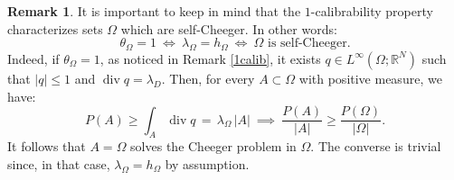\documentclass[reqno,11pt]{amsart}
\theoremstyle{definition}
\newtheorem{remark}[theorem]{Remark}
\numberwithin{equation}{section}
\DeclareMathOperator{\Div}{div}
\renewcommand{\div}{\Div}
\def\R{\mathbb{R}}
\newcommand{\1}{{{\bf 1}\kern-0,28em\rm l}}
\def\O{\Omega}
\def\l{\lambda}
\begin{document}
\begin{remark}\label{calib-Cheeger}  It is important to keep in mind that the $1$-calibrability property characterizes sets $\O$ which are self-Cheeger. In other words:
\begin{equation}\label{1calib=Cheeger}
\theta_\O = 1 \ \iff\ \l_\O=h_\O \ \iff \ \text{$\O$ is self-Cheeger}.
\end{equation}
  Indeed, if $\theta_\O=1$, as noticed in Remark \ref{1calib}, it exists $q\in L^\infty(\O;\R^N)$ such that $|q|\le 1$ and $\Div q= \l_D$.
Then, for every $A\subset \O$ with positive measure, we have:
$$ P(A) \ge \int_A \div q\, =\,  \l_\O \, |A| \ \implies \ \frac{P(A)}{|A|}  \ge \frac{P(\O)}{|\O|} .$$
It follows that $A=\O$ solves the Cheeger problem in $\O$. The converse is trivial since, in that case, $\l_\O=h_\O$ by assumption.  

\end{remark}
\end{document}
